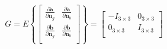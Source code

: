 \documentclass[a4paper]{paper}
\begin{document}
\begin{equation}
    G = E \left\{
        \left[
        \begin{matrix}
            \frac{\partial \dot{\bm{a}}}{\partial \bm{n}_g} & \frac{\partial \dot{\bm{a}}}{\partial \bm{n}_b}\\[0.3em]
            \frac{\partial \dot{\bm{b}}}{\partial \bm{n}_g} & \frac{\partial \dot{\bm{b}}}{\partial \bm{n}_b}\\
        \end{matrix}
        \right]
    \right\}
    = \left[
        \begin{matrix}
            -I_{3\times3} & 0_{3\times3}\\[0.3em]
            0_{3\times3} & I_{3\times3}\\
        \end{matrix}
        \right]
\end{equation}




\clearpage
\nocite{*}
\printbibliography[prefixnumbers={RD}]
\clearpage
\end{document}
